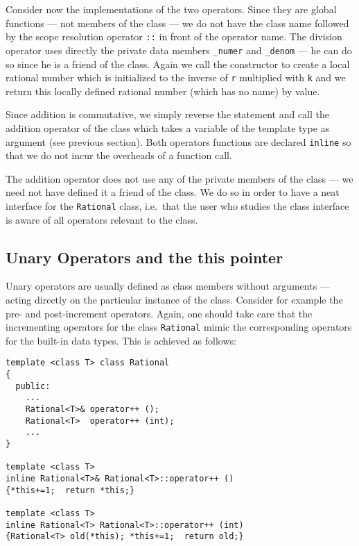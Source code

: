 Consider now the implementations of the two operators.
Since they are global functions --- not members of the class ---
we do not have the class name followed by the scope resolution
operator \verb+::+ in front of the operator name. The division
operator uses directly the private data members \verb+_numer+
and \verb+_denom+ --- he can do so since he is a friend of the
class. Again we call the constructor to create a local rational
number which is initialized to the inverse of \verb+r+ multiplied
with \verb+k+ and we return this locally defined rational number
(which has no name) by value.

Since addition is commutative, we simply reverse
the statement and call the addition operator of the class which
takes a variable of the template type as argument (see previous 
section). Both operators functions are declared \verb+inline+ so that
we do not incur the overheads of a function call.

The addition operator does not use any of the private
members of the class --- we need not have defined it a friend of the
class. We do so in order to have a neat interface for the \verb+Rational+
class, i.e.\ that the user who studies the class interface is aware of
all operators relevant to the class.


\subsection{Unary Operators and the {\bf this} pointer}

Unary operators are usually defined as class members without arguments
--- acting directly on the particular instance of the class. Consider for
example the pre- and post-increment operators. Again, one should take
care that the incrementing operators for the class \verb+Rational+ mimic
the corresponding operators for the built-in data types. This is achieved as 
follows:
{\footnotesize \begin{verbatim}
template <class T> class Rational
{
  public:
    ...
    Rational<T>& operator++ ();
    Rational<T>  operator++ (int);
    ...
}

template <class T>
inline Rational<T>& Rational<T>::operator++ ()
{*this+=1;  return *this;}

template <class T>
inline Rational<T> Rational<T>::operator++ (int)
{Rational<T> old(*this); *this+=1;  return old;}
\end{verbatim}}

